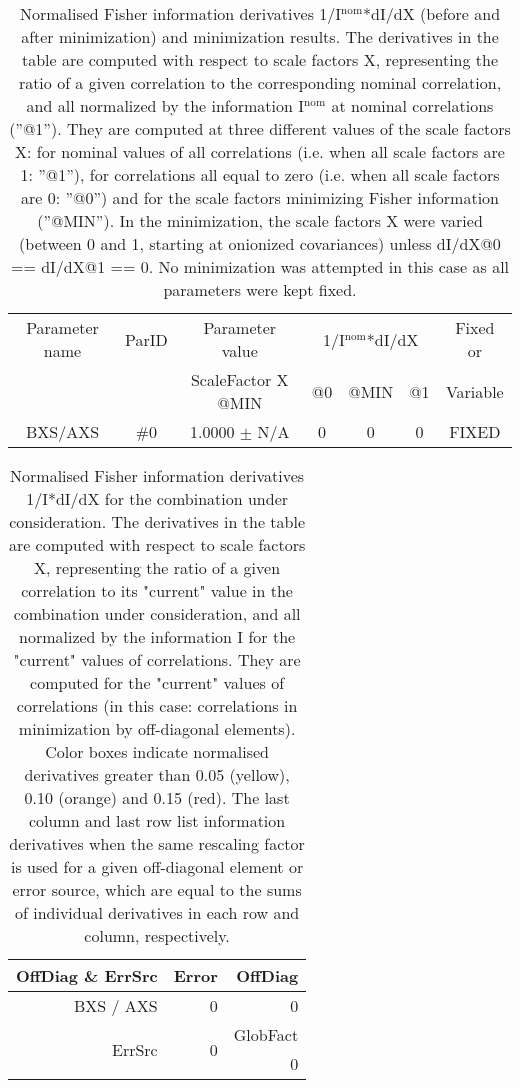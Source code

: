 \begin{table}[H]
\scriptsize
\begin{center}
\renewcommand{\arraystretch}{1.1}
\begin{tabular}{|c|c|c|ccc|c|}
\hline
Parameter name & ParID & Parameter value &\multicolumn{3}{|c|}{1/I$^\mathrm{nom}$*dI/dX} & Fixed or\\
 & & ScaleFactor X @MIN & @0 & @MIN & @1 & Variable\\
\hline
 {\tiny BXS/AXS} & \#0 &    1.0000 $\pm$ N/A & 0 & 0 & 0 & FIXED \\
\hline
\end{tabular}
\renewcommand{\arraystretch}{1}
\caption{Normalised Fisher information derivatives 1/I$^\mathrm{nom}$*dI/dX (before and after minimization) and minimization results.  The derivatives in the table are computed with respect to scale factors X, representing the ratio of a given correlation to the corresponding nominal correlation, and all normalized by the information I$^\mathrm{nom}$ at nominal correlations (''@1''). They are computed at three different values of the scale factors X: for nominal values of all correlations (i.e. when all scale factors are 1: ''@1''), for correlations all equal to zero (i.e. when all scale factors are 0: ''@0'') and for the scale factors minimizing Fisher information (''@MIN''). In the minimization, the scale factors X were varied (between 0 and 1, starting at onionized covariances) unless dI/dX@0 == dI/dX@1 == 0. No minimization was attempted in this case as all parameters were kept fixed.}
\end{center}
\end{table}
\begin{table}[H]
\scriptsize
\begin{center}
\renewcommand{\arraystretch}{1.1}
\begin{tabular}{|r|r|r|}
\hline
 OffDiag \& ErrSrc & {\tiny Error} & OffDiag\\
\hline
BXS / AXS &  0 &  0 \\
\hline
\multirow{2}{*}{ErrSrc} & \multirow{2}{*}{ 0} & GlobFact\\
 & &  0 \\
\hline
\end{tabular}
\renewcommand{\arraystretch}{1}
\caption{Normalised Fisher information derivatives 1/I*dI/dX for the combination under consideration. The derivatives in the table are computed with respect to scale factors X, representing the ratio of a given correlation to its "current" value in the combination under consideration, and all normalized by the information I for the "current" values of correlations. They are computed for the "current" values of correlations (in this case: correlations in minimization by off-diagonal elements). Color boxes indicate normalised derivatives greater than 0.05 (yellow), 0.10 (orange) and 0.15 (red). The last column and last row list information derivatives when the same rescaling factor is used for a given off-diagonal element or error source, which are equal to the sums of individual derivatives in each row and column, respectively.}
\end{center}
\end{table}
